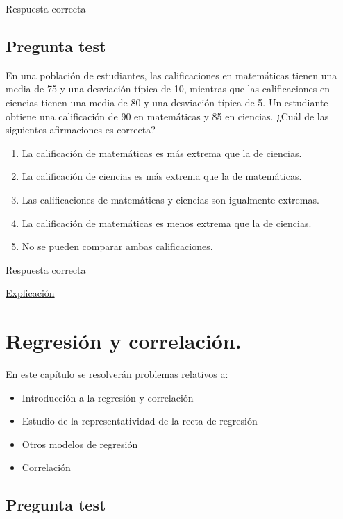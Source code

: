 \documentclass[
]{book}
\providecommand{\tightlist}{%
  \setlength{\itemsep}{0pt}\setlength{\parskip}{0pt}}
\begin{document}
Respuesta correcta

\hypertarget{pregunta-test-120}{%
\section{Pregunta test}\label{pregunta-test-120}}

En una población de estudiantes, las calificaciones en matemáticas tienen una media de 75 y una desviación típica de 10, mientras que las calificaciones en ciencias tienen una media de 80 y una desviación típica de 5. Un estudiante obtiene una calificación de 90 en matemáticas y 85 en ciencias. ¿Cuál de las siguientes afirmaciones es correcta?

\begin{enumerate}
\def\labelenumi{\alph{enumi})}
\tightlist
\item
  La calificación de matemáticas es más extrema que la de ciencias.
\item
  La calificación de ciencias es más extrema que la de matemáticas.
\item
  Las calificaciones de matemáticas y ciencias son igualmente extremas.
\item
  La calificación de matemáticas es menos extrema que la de ciencias.
\item
  No se pueden comparar ambas calificaciones.
\end{enumerate}

Respuesta correcta

\href{https://homepage.divms.uiowa.edu/~mbognar/applets/normal.html}{Explicación}

\hypertarget{regresiuxf3n-y-correlaciuxf3n.}{%
\chapter{Regresión y correlación.}\label{regresiuxf3n-y-correlaciuxf3n.}}

En este capítulo se resolverán problemas relativos a:

\begin{itemize}
\tightlist
\item
  Introducción a la regresión y correlación
\item
  Estudio de la representatividad de la recta de regresión
\item
  Otros modelos de regresión
\item
  Correlación
\end{itemize}

\hypertarget{pregunta-test-121}{%
\section{Pregunta test}\label{pregunta-test-121}}
\end{document}
